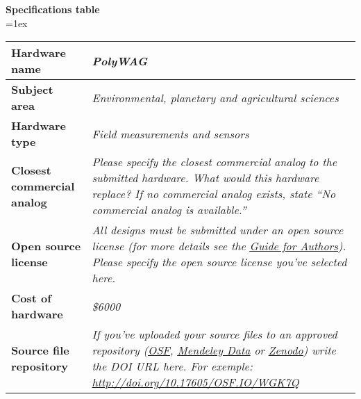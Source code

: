 \documentclass[11pt, letterpaper]{article}
\begin{document}
\begin{flushleft}
\newpage
\textbf{Specifications table}\\
\vskip 0.2cm
\tabulinesep=1ex
\begin{tabu} to \linewidth {|X|X[3,l]|}
\hline  \textbf{Hardware name} & \textit{PolyWAG}
  \\
  \hline \textbf{Subject area} & %
  \textit{Environmental, planetary and agricultural sciences}
  \\
  \hline \textbf{Hardware type} &
    \textit{Field measurements and sensors}
  \\ 
\hline \textbf{Closest commercial analog} &
  \textit{Please specify the closest commercial analog to the submitted hardware. What would this hardware replace? If no commercial analog exists, state “No commercial analog is available.”}
  \\
\hline \textbf{Open source license} &
  {\it All designs must be submitted under an open source license (for more details see the \href{https://www.elsevier.com/journals/hardwarex/2468-0672/guide-for-authors}{\underline{Guide for Authors}}). Please specify the open source license you’ve selected here. }
  \\
\hline \textbf{Cost of hardware} &
  \textit{\$6000}
  \\
\hline \textbf{Source file repository} & 
  \textit{If you’ve uploaded your source files to an approved repository (\href{http://osf.io}{\underline{OSF}}, \href{https://data.mendeley.com/}{\underline{Mendeley Data}} or \href{https://zenodo.org/}{\underline{Zenodo}}) write the DOI URL here. For exemple:  \href{http://doi.org/10.17605/OSF.IO/WGK7Q}{http://doi.org/10.17605/OSF.IO/WGK7Q}}  

\end{tabu}
\end{flushleft}
\end{document}
